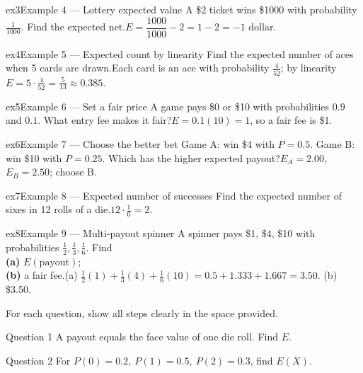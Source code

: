 \documentclass[11pt]{article}
\begin{document}
\begin{example}{ex3}{Example 4 --- Lottery expected value}
A \$2 ticket wins \$1000 with probability $\tfrac{1}{1000}$. Find the expected net.\soln $E=\dfrac{1000}{1000}-2=1-2=-1$ dollar.
\end{example}

\begin{example}{ex4}{Example 5 --- Expected count by linearity}
Find the expected number of aces when 5 cards are drawn.\soln Each card is an ace with probability $\tfrac{4}{52}$; by linearity $E=5\cdot\tfrac{4}{52}=\tfrac{5}{13}\approx0.385$.
\end{example}

\begin{example}{ex5}{Example 6 --- Set a fair price}
A game pays \$0 or \$10 with probabilities $0.9$ and $0.1$. What entry fee makes it fair?\soln $E=0.1(10)=1$, so a fair fee is \$1.
\end{example}

\begin{example}{ex6}{Example 7 --- Choose the better bet}
Game A: win \$4 with $P=0.5$. Game B: win \$10 with $P=0.25$. Which has the higher expected payout?\soln $E_A=2.00$, $E_B=2.50$; choose B.
\end{example}

\begin{example}{ex7}{Example 8 --- Expected number of successes}
Find the expected number of sixes in 12 rolls of a die.\soln $12\cdot\tfrac16=2$.
\end{example}

\begin{example}{ex8}{Example 9 --- Multi-payout spinner}
A spinner pays \$1, \$4, \$10 with probabilities $\tfrac12,\tfrac13,\tfrac16$. Find \\ \textbf{(a)} $E(\text{payout})$; \\ \textbf{(b)} a fair fee.\soln (a) $\tfrac12(1)+\tfrac13(4)+\tfrac16(10)=0.5+1.333+1.667=3.50$. (b) \$3.50.
\end{example}

\clearpage
{}
For each question, show all steps clearly in the space provided.

\begin{qbox}{Question 1}
A payout equals the face value of one die roll. Find $E$.\workspace{2.4cm}
\end{qbox}

\begin{qbox}{Question 2}
For $P(0)=0.2,\ P(1)=0.5,\ P(2)=0.3$, find $E(X)$.\workspace{2.4cm}
\end{qbox}
\end{document}
